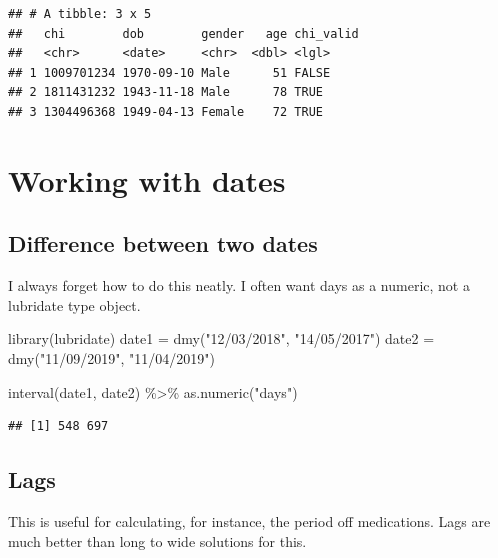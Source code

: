 \documentclass[
]{book}
\newenvironment{Shaded}{\begin{snugshade}}{\end{snugshade}}
\newcommand{\FunctionTok}[1]{\textcolor[rgb]{0.00,0.00,0.00}{#1}}
\newcommand{\NormalTok}[1]{#1}
\newcommand{\OtherTok}[1]{\textcolor[rgb]{0.56,0.35,0.01}{#1}}
\newcommand{\SpecialCharTok}[1]{\textcolor[rgb]{0.00,0.00,0.00}{#1}}
\newcommand{\StringTok}[1]{\textcolor[rgb]{0.31,0.60,0.02}{#1}}
\begin{document}
\begin{verbatim}
## # A tibble: 3 x 5
##   chi        dob        gender   age chi_valid
##   <chr>      <date>     <chr>  <dbl> <lgl>    
## 1 1009701234 1970-09-10 Male      51 FALSE    
## 2 1811431232 1943-11-18 Male      78 TRUE     
## 3 1304496368 1949-04-13 Female    72 TRUE
\end{verbatim}

\hypertarget{working-with-dates}{%
\section{Working with dates}\label{working-with-dates}}

\hypertarget{difference-between-two-dates}{%
\subsection{Difference between two dates}\label{difference-between-two-dates}}

I always forget how to do this neatly.
I often want days as a numeric, not a lubridate type object.

\begin{Shaded}
\begin{Highlighting}[]
\FunctionTok{library}\NormalTok{(lubridate)}
\NormalTok{date1 }\OtherTok{=} \FunctionTok{dmy}\NormalTok{(}\StringTok{"12/03/2018"}\NormalTok{, }\StringTok{"14/05/2017"}\NormalTok{)}
\NormalTok{date2 }\OtherTok{=} \FunctionTok{dmy}\NormalTok{(}\StringTok{"11/09/2019"}\NormalTok{, }\StringTok{"11/04/2019"}\NormalTok{)}

\FunctionTok{interval}\NormalTok{(date1, date2) }\SpecialCharTok{\%\textgreater{}\%} 
  \FunctionTok{as.numeric}\NormalTok{(}\StringTok{"days"}\NormalTok{)}
\end{Highlighting}
\end{Shaded}

\begin{verbatim}
## [1] 548 697
\end{verbatim}

\hypertarget{lags}{%
\subsection{Lags}\label{lags}}

This is useful for calculating, for instance, the period off medications. Lags are much better than long to wide solutions for this.
\end{document}
